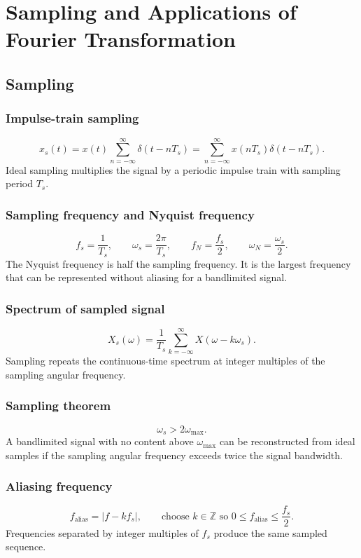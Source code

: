 \section{Sampling and Applications of Fourier Transformation}

\subsection{Sampling}

\subsubsection{Impulse-train sampling}
\[
x_s(t)=x(t)\sum_{n=-\infty}^{\infty}\delta(t-nT_s)
=\sum_{n=-\infty}^{\infty}x(nT_s)\delta(t-nT_s).
\]
Ideal sampling multiplies the signal by a periodic impulse train with sampling period \(T_s\).

\subsubsection{Sampling frequency and Nyquist frequency}
\[
f_s=\frac{1}{T_s},\qquad \omega_s=\frac{2\pi}{T_s},\qquad
f_N=\frac{f_s}{2},\qquad \omega_N=\frac{\omega_s}{2}.
\]
The Nyquist frequency is half the sampling frequency. It is the largest frequency that can be represented without aliasing for a bandlimited signal.

\subsubsection{Spectrum of sampled signal}
\[
X_s(\omega)=\frac{1}{T_s}\sum_{k=-\infty}^{\infty}X(\omega-k\omega_s).
\]
Sampling repeats the continuous-time spectrum at integer multiples of the sampling angular frequency.

\subsubsection{Sampling theorem}
\[
\omega_s>2\omega_{\max}.
\]
A bandlimited signal with no content above \(\omega_{\max}\) can be reconstructed from ideal samples if the sampling angular frequency exceeds twice the signal bandwidth.

\subsubsection{Aliasing frequency}
\[
f_{\mathrm{alias}}=\left|f-kf_s\right|,\qquad
\text{choose }k\in\mathbb{Z}\text{ so }0\leq f_{\mathrm{alias}}\leq \frac{f_s}{2}.
\]
Frequencies separated by integer multiples of \(f_s\) produce the same sampled sequence.

